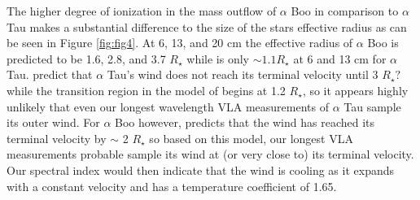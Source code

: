 \documentclass[iop]{emulateapj}
\begin{document}
The higher degree of ionization in the mass outflow of $\alpha$ Boo in comparison to $\alpha$ Tau makes a substantial difference to the size of the stars effective radius as can be seen in Figure \ref{fig:fig4}. At 6, 13, and 20 cm the effective radius of $\alpha$ Boo is predicted to be 1.6, 2.8, and 3.7 $R_{\star}$ while is only $\sim 1.1 R_{\star}$ at 6 and 13 cm for $\alpha$ Tau. \cite{1998ApJ...503..396R} predict that $\alpha$ Tau's wind does not reach its terminal velocity until 3 $R_{\star}?$ while the transition region in the model of \cite{1999MNRAS.302...37M} begins at 1.2 $R_{\star}$, so it appears highly unlikely that even our longest wavelength VLA measurements of $\alpha$ Tau sample its outer wind. For $\alpha$ Boo however, \cite{1985pssl.proc..351D} predicts that the wind has reached its terminal velocity by $\sim$ 2 $R_{\star}$ so based on this model, our longest VLA measurements probable sample its wind at (or very close to) its terminal velocity. Our spectral index would then indicate that the wind is cooling as it expands with a constant velocity and has a temperature coefficient of 1.65.
\end{document}
